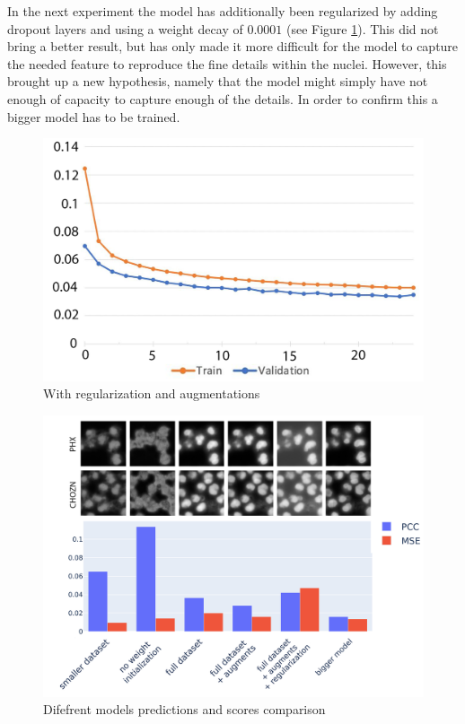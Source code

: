 In the next experiment the model has additionally been regularized by adding dropout layers and using a weight decay of $0.0001$ (see Figure \ref{fig:full-dataset-pcc-regularized}). This did not bring a better result, but has only made it more difficult for the model to capture the needed feature to reproduce the fine details within the nuclei. However, this brought up a new hypothesis, namely that the model might simply have not enough of capacity to capture enough of the details. In order to confirm this a bigger model has to be trained.
\begin{figure}[htb]
	\begin{center}
		\includegraphics[width=0.5\linewidth]{bilder/nuclei/full-dataset-regularized.png}
		\caption{With regularization and augmentations}\label{fig:full-dataset-pcc-regularized}
	\end{center}
\end{figure}

\begin{figure}[htb]
	\begin{center}
		\includegraphics[width=0.6\linewidth]{bilder/nuclei/comparison-chzn-phx.png}
		\caption{Difefrent models predictions and scores comparison}\label{fig:nuclei-comparison-predictions}
	\end{center}
\end{figure}

